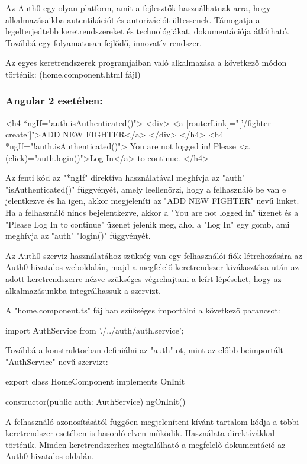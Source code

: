
Az Auth0 egy olyan platform, amit a fejlesztők használhatnak arra, hogy alkalmazásaikba autentikációt és autorizációt ültessenek. Támogatja a legelterjedtebb keretrendszereket és technológiákat, dokumentációja átlátható. Továbbá egy folyamatosan fejlődő, innovatív rendszer. \cite{Auth0}

Az egyes keretrendszerek programjaiban való alkalmazása a következő módon történik: (home.component.html fájl)

\subsubsection{Angular 2 esetében:}

\begin{cpp}
<h4 *ngIf="auth.isAuthenticated()">
    <div>
   	<a [routerLink]="['/fighter-create']">ADD NEW FIGHTER</a>
   	</div>
</h4>
<h4 *ngIf="!auth.isAuthenticated()">
  You are not logged in! Please 
  <a (click)="auth.login()">Log In</a> to continue.
</h4>
\end{cpp}

Az fenti kód az "*ngIf" direktíva használatával meghívja az "auth" "isAuthenticated()" függvényét, amely leellenőrzi, hogy a felhasználó be van e jelentkezve és ha igen, akkor megjeleníti az "ADD NEW FIGHTER" nevű linket. Ha a felhasználó nincs bejelentkezve, akkor a "You are not logged in" üzenet és a "Please Log In to continue" üzenet jelenik meg, ahol a "Log In" egy gomb, ami meghívja az "auth" "login()" függvényét.

Az Auth0 szerviz használatához szükség van egy felhasználói fiók létrehozására az Auth0 hivatalos weboldalán, majd a megfelelő keretrendszer kiválasztása után az adott keretrendszerre nézve szükséges végrehajtani a leírt lépéseket, hogy az alkalmazásunkba integrálhassuk a szervizt.

A "home.component.ts" fájlban szükséges importálni a következő parancsot:
\begin{cpp}
import { AuthService } from './../auth/auth.service';
\end{cpp}

Továbbá a konstruktorban definiálni az "auth"-ot, mint az előbb beimportált\\ "AuthService" nevű szervizt:
\begin{cpp}
export class HomeComponent implements OnInit {

  constructor(public auth: AuthService) { }
  ngOnInit() {
  }
}
\end{cpp}

A felhasználó azonosításától függően megjeleníteni kívánt tartalom kódja a többi keretrendszer esetében is hasonló elven működik. Használata direktívákkal történik. Minden keretrendszerhez megtalálható a megfelelő dokumentáció az Auth0 hivatalos oldalán. \cite{Auth0}

